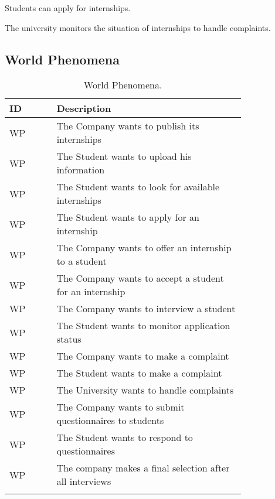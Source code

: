 Students can apply for internships.

The university monitors the situation of internships to handle complaints.

\subsection{World Phenomena}
\label{subsec:world_phenomena}%
\setcounter{wp}{1}
\newcommand{\cwp}{\thewp\stepcounter{wp}}
\begin{center}
    \begin{longtable}{ |l|p{0.8\linewidth}| }
        \hline
        \textbf{ID} & \textbf{Description}                                                \\
        \hline
        WP\cwp      & The Company wants to publish its internships\\
        \hline
        WP\cwp      & The Student wants to upload his information \\
        \hline
        WP\cwp      & The Student wants to look for available internships \\
        \hline
        WP\cwp      & The Student wants to apply for an internship \\
        \hline
        WP\cwp      & The Company wants to offer an internship to a student \\
        \hline
        WP\cwp      & The Company wants to accept a student for an internship \\
        \hline
        WP\cwp      & The Company wants to interview a student \\
        \hline
        WP\cwp      & The Student wants to monitor application status \\
        \hline
        WP\cwp      & The Company wants to make a complaint \\
        \hline
        WP\cwp      & The Student wants to make a complaint \\
        \hline
        WP\cwp      & The University wants to handle complaints \\
        \hline
        WP\cwp      & The Company wants to submit questionnaires to students \\
        \hline
        WP\cwp      & The Student wants to respond to questionnaires \\
        \hline
        WP\cwp      & The company makes a final selection after all interviews \\
        \hline
        \caption{World Phenomena.}
        \label{tab:worldph_tab}%
    \end{longtable}
\end{center}

